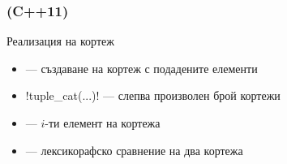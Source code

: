 \documentclass[alsotrans]{beamerswitch}
\begin{document}
\begin{frame}
  \frametitle{ (C++11)}

  Реализация на кортеж
  \begin{itemize}
  \item {} --- създаване на кортеж с подадените елементи
  \item \lst!tuple_cat(...)! --- слепва произволен брой кортежи
  \item {} --- $i$-ти елемент на кортежа
  \item \lst {==,!=,<,>,<=,>=} --- лексикорафско сравнение на два кортежа
  \end{itemize}
\end{frame}
\end{document}
